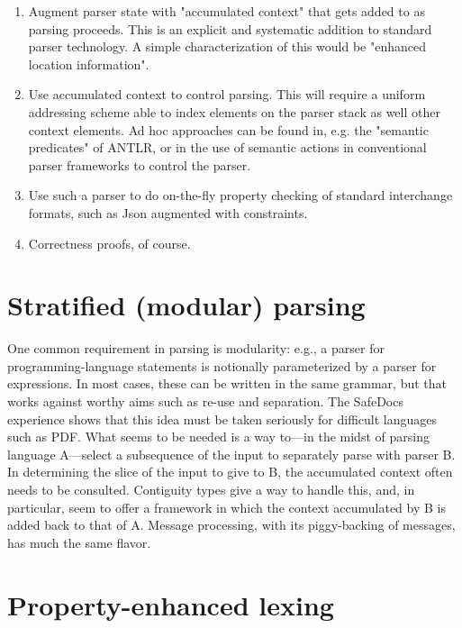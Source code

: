 \documentclass{article}
\begin{document}
\begin{enumerate}

\item Augment parser state with "accumulated context" that gets added
      to as parsing proceeds. This is an explicit and systematic
      addition to standard parser technology. A simple
      characterization of this would be "enhanced location
      information".

\item Use accumulated context to control parsing. This will require a
      uniform addressing scheme able to index elements on the parser
      stack as well other context elements. Ad hoc approaches can be
      found in, e.g. the "semantic predicates" of ANTLR, or in the use
      of semantic actions in conventional parser frameworks to control
      the parser.

\item Use such a parser to do on-the-fly property checking of standard
      interchange formats, such as Json augmented with constraints.

\item Correctness proofs, of course.
\end{enumerate}

\section{Stratified (modular) parsing}

   One common requirement in parsing is modularity: e.g., a parser for
   programming-language statements is notionally parameterized by a
   parser for expressions. In most cases, these can be written in the
   same grammar, but that works against worthy aims such as re-use and
   separation. The SafeDocs experience shows that this idea must be
   taken seriously for difficult languages such as PDF. What seems to
   be needed is a way to---in the midst of parsing language A---select
   a subsequence of the input to separately parse with parser B. In
   determining the slice of the input to give to B, the accumulated
   context often needs to be consulted. Contiguity types give a way to
   handle this, and, in particular, seem to offer a framework in which
   the context accumulated by B is added back to that of A. Message
   processing, with its piggy-backing of messages, has much the same
   flavor.

\section{Property-enhanced lexing}
\end{document}
